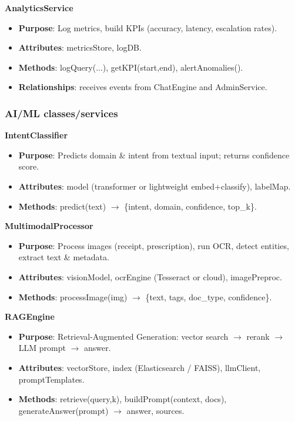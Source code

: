 \textbf{AnalyticsService}

\begin{itemize}\setlength{\itemsep}{0pt}
\item \textbf{Purpose}: Log metrics, build KPIs (accuracy, latency, escalation rates).
\item \textbf{Attributes}: metricsStore, logDB.
\item \textbf{Methods}: logQuery(...), getKPI(start,end), alertAnomalies().
\item \textbf{Relationships}: receives events from ChatEngine and AdminService.
\end{itemize}

\subsubsection{AI/ML classes/services}

\textbf{IntentClassifier}

\begin{itemize}\setlength{\itemsep}{0pt}
\item \textbf{Purpose}: Predicts domain \& intent from textual input; returns confidence score.
\item \textbf{Attributes}: model (transformer or lightweight embed+classify), labelMap.
\item \textbf{Methods}: predict(text) $\rightarrow$ \{intent, domain, confidence, top\_k\}.
\end{itemize}

\textbf{MultimodalProcessor}

\begin{itemize}\setlength{\itemsep}{0pt}
\item \textbf{Purpose}: Process images (receipt, prescription), run OCR, detect entities, extract text \& metadata.
\item \textbf{Attributes}: visionModel, ocrEngine (Tesseract or cloud), imagePreproc.
\item \textbf{Methods}: processImage(img) $\rightarrow$ \{text, tags, doc\_type, confidence\}.
\end{itemize}

\textbf{RAGEngine}

\begin{itemize}\setlength{\itemsep}{0pt}
\item \textbf{Purpose}: Retrieval-Augmented Generation: vector search $\rightarrow$ rerank $\rightarrow$ LLM prompt $\rightarrow$ answer.
\item \textbf{Attributes}: vectorStore, index (Elasticsearch / FAISS), llmClient, promptTemplates.
\item \textbf{Methods}: retrieve(query,k), buildPrompt(context, docs), generateAnswer(prompt) $\rightarrow$ answer, sources.
\end{itemize}

